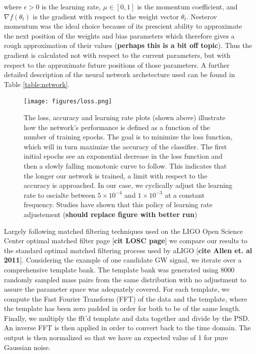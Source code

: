 \documentclass[%
 amsmath,amssymb,
 aps,
 twocolumn,
 prl,
 reprint,
floatfix,
]{revtex4-1}
\begin{document}
where $\epsilon > 0$ is the learning rate, $\mu \in [0,1]$ is the momentum coefficient, and $\nabla f(\theta_{t})$ is the gradient with respect to the weight vector $\theta_{t}$. Nesterov momentum was the ideal choice because of its prescient ability to approximate the next position of the weights and bias parameters which therefore gives a rough approximation of their values (\textbf{perhaps this is a bit off topic}). Thus the gradient is calculated not with respect to the current parameters, but with respect to the approximate future positions of those parameters. A further detailed description of the neural network archetecture used can be found in Table \ref{table:network}.

\begin{figure}[!h]
 \texttt{[image: figures/loss.png]}
 \caption{\label{fig:loss_curve} The loss, accuracy and learning rate plots (shown above) illustrate how the network's performance is defined as a function of the number of training epochs. The goal is to minimize the loss function, which will in turn maximize the accuracy of the classifier. The first initial epochs see an exponential decrease in the loss function and then a slowly falling monotonic curve to follow. This indicates that the longer our network is trained, a limit with respect to the accuracy is approached. In our case, we cyclically adjust the learning rate to oscialte between $5 \times 10^{-4}$ and $1 \times 10^{-3}$ at a constant frequency. Studies have shown that this policy of learning rate adjustement (\textbf{should replace figure with better run})
}
\end{figure}

Largely following matched filtering techniques used on the LIGO Open Science Center optimal matched filter page [\textbf{cit LOSC page}] we compare our results to the standard optimal matched filtering process used by aLIGO [\textbf{cite Allen et. al 2011}]. Considering the example of one candidate GW signal, we iterate over a comprehensive template bank. The template bank was generated using 8000 randomly sampled mass pairs from the same distribution with no adjustment to assure the parameter space was adequately covered. For each template, we compute the Fast Fourier Transform (FFT) of the data and the template, where the template has been zero padded in order for both to be of the same length. Finally, we multiply the fft'd template and data together and divide by the PSD. An inverse FFT is then applied in order to convert back to the time domain. The output is then normalized so that we have an expected value of 1 for pure Gaussian noise.
\end{document}
